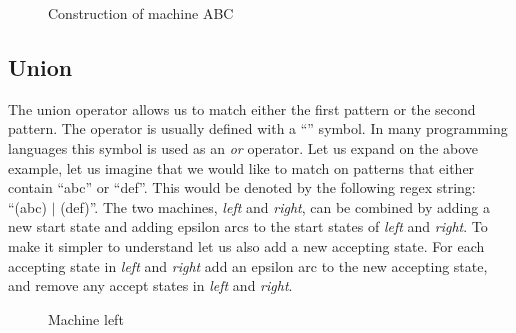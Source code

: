 \begin{figure}[htp!]
      \caption*{Construction of machine ABC}
\end{figure}

\subsection{Union}
The union operator allows us to match either the first pattern or the second pattern. The operator is usually defined with a ``\text{$|$}'' symbol. In many programming languages this symbol is used as an \textit{or} operator. Let us expand on the above example, let us imagine that we would like to match on patterns that either contain ``abc'' or ``def''. This would be denoted by the following regex string: ``(abc) $|$ (def)''. The two machines, \textit{left} and \textit{right}, can be combined by adding a new start state and adding epsilon arcs to the start states of \textit{left} and \textit{right}. To make it simpler to understand let us also add a new accepting state. For each accepting state in \textit{left} and \textit{right} add an epsilon arc to the new accepting state, and remove any accept states in \textit{left} and \textit{right}.

\begin{figure}[htp!]
      \caption*{Machine left}
\end{figure}


